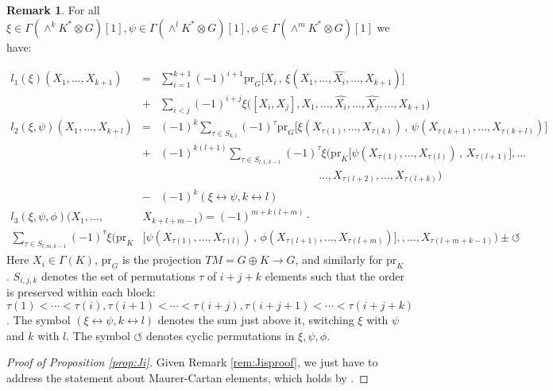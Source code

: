 \documentclass[11pt,thmsa]{amsart}
\theoremstyle{definition}
\newtheorem{remark}[theorem]{Remark}
\begin{document}
\begin{remark}
For all $\xi \in \Gamma(\wedge^k K^*\otimes G)[1], \psi \in \Gamma(\wedge^l K^*\otimes G)[1],
 \phi \in \Gamma(\wedge^m K^*\otimes G)[1]$ we have:
 



  
\begin{eqnarray*}
 l_1(\xi)(X_1,\dots,X_{k+1})&=&\sum_{i=1}^{k+1}(-1)^{i+1} \mathrm{pr}_G\Big[X_i\,,\,\xi(X_1,\dots,\hat{X_i},\dots,X_{k+1})\Big]\\
 &+& \sum_{i<j}(-1)^{i+j}\xi\Big([X_i,X_j],X_1,\dots,\hat{X_i},\dots,\hat{X_j},\dots,X_{k+1}\Big)\\ 
  l_2(\xi,\psi)(X_1,\dots,X_{k+l})&=&(-1)^{k}\sum_{\tau\in S_{k,l}}(-1)^{\tau} \mathrm{pr}_G\Big[\xi(
 X_{\tau(1)},\dots,X_{\tau(k)})\,,\,\psi(X_{\tau(k+1)},\dots,X_{\tau(k+l)})\Big]
 \\
  &+&(-1)^{k(l+1)} \sum_{\tau\in S_{l,1,k-1}}(-1)^{\tau} \xi\Big(\mathrm{pr}_K\Big[\psi( X_{\tau(1)},\dots,X_{\tau(l)})\,,\,X_{\tau(l+1)}\Big],\dots\\
  && \hspace{6cm} \dots,X_{\tau(l+2)},\dots,  X_{\tau(l+k)}\Big)
 \\
  &-& (-1)^{k} (\xi \leftrightarrow \psi, k\leftrightarrow l)\end{eqnarray*}
  \begin{align*}
 l_3(\xi,\psi,\phi)(X_1,\dots,&X_{k+l+m-1})=  (-1)^{m+k(l+m)}\cdot\\
\sum_{\tau\in S_{l,m,k-1}}(-1)^{\tau}  \xi\Big(\mathrm{pr}_K &\Big[
 \psi(X_{\tau(1)},\dots,X_{\tau(l)})\,,\,\phi(X_{\tau(l+1)},\dots,X_{\tau(l+m)})\Big],
,\dots,X_{\tau(l+m+k-1)}\Big) \pm\circlearrowleft
\end{align*}
Here $X_i\in \Gamma(K)$,  $\mathrm{pr}_G$ is the projection $TM=G\oplus K\to G$, and similarly for $\mathrm{pr}_K$. $S_{i,j,k}$ denotes the set of permutations $\tau$ of $i+j+k$ elements such that the order is preserved within each block:
$\tau(1)<\cdots<\tau(i), \tau(i+1)<\cdots<\tau(i+j), \tau(i+j+1)<\cdots<\tau(i+j+k)
$. The symbol
$(\xi \leftrightarrow \psi, k\leftrightarrow l)$ denotes the sum just above it, switching $\xi$ with $\psi$ and $k$ with $l$. The symbol $\circlearrowleft$ denotes cyclic permutations in $\xi,\psi,\phi$.
\end{remark}



\begin{proof}[Proof of Proposition \ref{prop:Ji}]
Given Remark \ref{rem:Jisproof}, we just have to address the statement about Maurer-Cartan elements, which holds by \cite[Theorem 4.14]{Ji}.
\end{proof}
\end{document}
